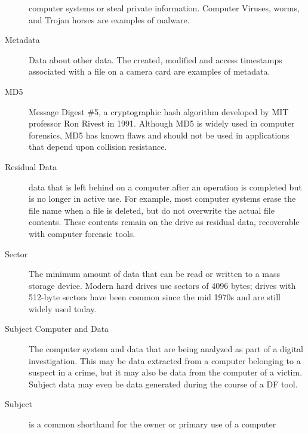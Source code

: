 \begin{description}
  computer systems or steal private information. Computer Viruses,
  worms, and Trojan horses are examples of malware. 
\item[Metadata] Data about other data. The created, modified and
  access timestamps associated with a file on a camera card are
  examples of metadata.
\item[MD5] Message Digest \#5, a cryptographic hash algorithm
  developed by MIT professor Ron Rivest in 1991. Although MD5 is
  widely used in computer forensics, MD5 has known flaws and should
  not be used in applications that depend upon collision resistance.
\item[Residual Data] data that is left behind on a computer after an
  operation is completed but is no longer in active use. For example,
  most computer systems erase the file name when a file is deleted,
  but do not overwrite the actual file contents. These contents remain
  on the drive as residual data, recoverable with computer forensic tools.
\item[Sector] The minimum amount of data that can be read or written
  to a mass storage device. Modern hard drives use sectors of 4096
  bytes; drives with 512-byte sectors have been common since the mid
  1970s and are still widely used today.
\item[Subject Computer and Data] The computer system and data that are
  being analyzed as part of a digital investigation. This may be data
  extracted from a computer belonging to a suspect in a crime, but it
  may also be data from the computer of a victim. Subject data may
  even be data generated during the course of a DF tool.
\item[Subject] is a common shorthand for the owner or primary use of a computer

\end{description}
